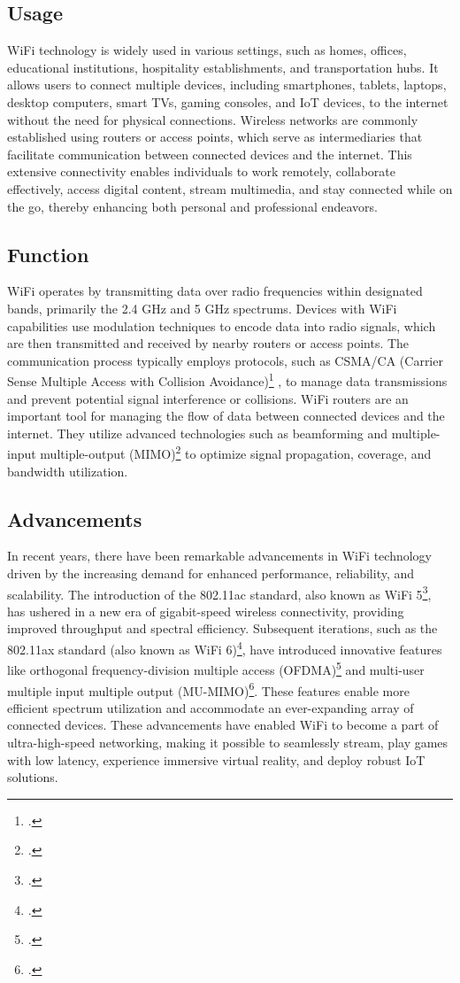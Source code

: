 \subsection{Usage}
WiFi technology is widely used in various settings, such as homes, offices, educational institutions, hospitality establishments, and transportation hubs. It allows users to connect multiple devices, including smartphones, tablets, laptops, desktop computers, smart TVs, gaming consoles, and IoT devices, to the internet without the need for physical connections. Wireless networks are commonly established using routers or access points, which serve as intermediaries that facilitate communication between connected devices and the internet. This extensive connectivity enables individuals to work remotely, collaborate effectively, access digital content, stream multimedia, and stay connected while on the go, thereby enhancing both personal and professional endeavors.

\subsection{Function}
WiFi operates by transmitting data over radio frequencies within designated bands, primarily the 2.4 GHz and 5 GHz spectrums. Devices with WiFi capabilities use modulation techniques to encode data into radio signals, which are then transmitted and received by nearby routers or access points. The communication process typically employs protocols, such as CSMA/CA (Carrier Sense Multiple Access with Collision Avoidance)\footcite{csma_ca} , to manage data transmissions and prevent potential signal interference or collisions. WiFi routers are an important tool for managing the flow of data between connected devices and the internet. They utilize advanced technologies such as beamforming and multiple-input multiple-output (MIMO)\footcite{mimo}  to optimize signal propagation, coverage, and bandwidth utilization.

\subsection{Advancements}
In recent years, there have been remarkable advancements in WiFi technology driven by the increasing demand for enhanced performance, reliability, and scalability. The introduction of the 802.11ac standard, also known as WiFi 5\footcite{wifi5}, has ushered in a new era of gigabit-speed wireless connectivity, providing improved throughput and spectral efficiency. Subsequent iterations, such as the 802.11ax standard (also known as WiFi 6)\footcite{wifi6}, have introduced innovative features like orthogonal frequency-division multiple access (OFDMA)\footcite{ofdma} and multi-user multiple input multiple output (MU-MIMO)\footcite{mu_mimo}. These features enable more efficient spectrum utilization and accommodate an ever-expanding array of connected devices. These advancements have enabled WiFi to become a part of ultra-high-speed networking, making it possible to seamlessly stream, play games with low latency, experience immersive virtual reality, and deploy robust IoT solutions.

